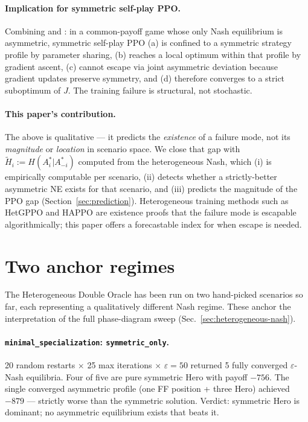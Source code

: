 \documentclass{article}
\begin{document}
\paragraph{Implication for symmetric self-play PPO.}
Combining \cite{fey2012symmetric} and \cite{emmons2022symmetric}: in a
common-payoff game whose only Nash equilibrium is asymmetric, symmetric
self-play PPO (a) is confined to a symmetric strategy profile by parameter
sharing, (b) reaches a local optimum within that profile by gradient ascent,
(c) cannot escape via joint asymmetric deviation because gradient updates
preserve symmetry, and (d) therefore converges to a strict suboptimum of $J$.
The training failure is structural, not stochastic.

\paragraph{This paper's contribution.}
The above is qualitative — it predicts the \emph{existence} of a failure mode,
not its \emph{magnitude} or \emph{location} in scenario space.  We close that
gap with $\tilde{H}_i := H(A_i^*|A_{-i}^*)$ computed from the heterogeneous
Nash, which (i) is empirically computable per scenario, (ii) detects whether
a strictly-better asymmetric NE exists for that scenario, and (iii) predicts
the magnitude of the PPO gap (Section~\ref{sec:prediction}).  Heterogeneous
training methods such as HetGPPO \cite{bettini2023hetgppo} and HAPPO
\cite{zhong2024harl} are existence proofs that the failure mode is escapable
algorithmically; this paper offers a forecastable index for when escape is
needed.

\section{Two anchor regimes}
\label{sec:symmetric-nash}

The Heterogeneous Double Oracle has been run on two hand-picked scenarios so
far, each representing a qualitatively different Nash regime.  These anchor the
interpretation of the full phase-diagram sweep (Sec.~\ref{sec:heterogeneous-nash}).

\paragraph{\texttt{minimal\_specialization}: \texttt{symmetric\_only}.}
20 random restarts $\times$ 25 max iterations $\times$ $\varepsilon=50$
returned 5 fully converged $\varepsilon$-Nash equilibria.  Four of five are
pure symmetric Hero with payoff $-756$.  The single converged asymmetric
profile (one \textsc{FF} position + three Hero) achieved $-879$ — strictly
worse than the symmetric solution.  Verdict: symmetric Hero is dominant; no
asymmetric equilibrium exists that beats it.
\end{document}
